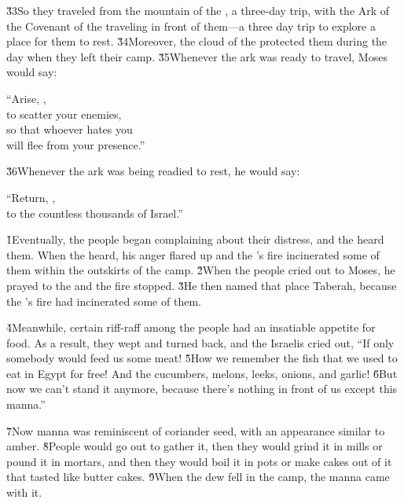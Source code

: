 \v{33}So they traveled from the mountain of the , a three-day trip, with the Ark of the Covenant of the  traveling in front of them---a three day trip to explore a place for them to rest. \v{34}Moreover, the cloud of the  protected them during the day when they left their camp. \v{35}Whenever the ark was ready to travel, Moses would say:

\begin{poetry}
\poeml ``Arise, , \\
\poemll    to scatter your enemies, \\
\poeml so that whoever hates you \\
\poemll    will flee from your presence.''
\end{poetry}

\v{36}Whenever the ark was being readied to rest, he would say:

\begin{poetry}
\poeml ``Return, , \\
\poemll    to the countless thousands of Israel.''
\end{poetry}

\v{1}Eventually, the people began complaining about their distress, and the  heard them. When the  heard, his anger flared up and the 's fire incinerated some of them within the outskirts of the camp. \v{2}When the people cried out to Moses, he prayed to the  and the fire stopped. \v{3}He then named that place Taberah, because the 's fire had incinerated some of them.

\v{4}Meanwhile, certain riff-raff among the people had an insatiable appetite for food. As a result, they wept and turned back, and the Israelis cried out, ``If only somebody would feed us some meat! \v{5}How we remember the fish that we used to eat in Egypt for free! And the cucumbers, melons, leeks, onions, and garlic! \v{6}But now we can't stand it anymore, because there's nothing in front of us except this manna.''

\v{7}Now manna was reminiscent of coriander seed, with an appearance similar to amber. \v{8}People would go out to gather it, then they would grind it in mills or pound it in mortars, and then they would boil it in pots or make cakes out of it that tasted like butter cakes. \v{9}When the dew fell in the camp, the manna came with it.

